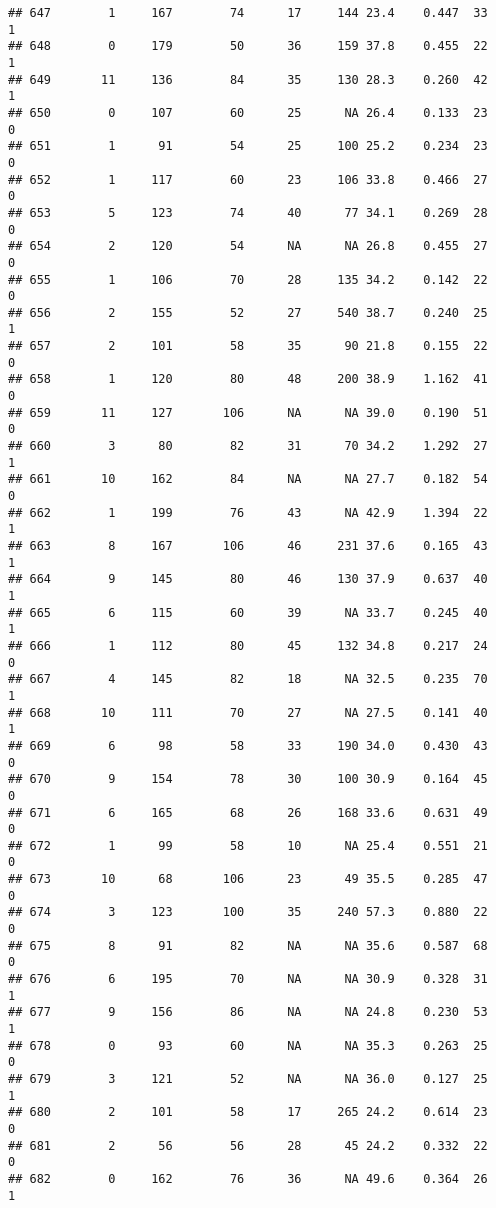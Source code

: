 \documentclass[
]{article}
\begin{document}
\begin{verbatim}
## 647        1     167        74      17     144 23.4    0.447  33    1
## 648        0     179        50      36     159 37.8    0.455  22    1
## 649       11     136        84      35     130 28.3    0.260  42    1
## 650        0     107        60      25      NA 26.4    0.133  23    0
## 651        1      91        54      25     100 25.2    0.234  23    0
## 652        1     117        60      23     106 33.8    0.466  27    0
## 653        5     123        74      40      77 34.1    0.269  28    0
## 654        2     120        54      NA      NA 26.8    0.455  27    0
## 655        1     106        70      28     135 34.2    0.142  22    0
## 656        2     155        52      27     540 38.7    0.240  25    1
## 657        2     101        58      35      90 21.8    0.155  22    0
## 658        1     120        80      48     200 38.9    1.162  41    0
## 659       11     127       106      NA      NA 39.0    0.190  51    0
## 660        3      80        82      31      70 34.2    1.292  27    1
## 661       10     162        84      NA      NA 27.7    0.182  54    0
## 662        1     199        76      43      NA 42.9    1.394  22    1
## 663        8     167       106      46     231 37.6    0.165  43    1
## 664        9     145        80      46     130 37.9    0.637  40    1
## 665        6     115        60      39      NA 33.7    0.245  40    1
## 666        1     112        80      45     132 34.8    0.217  24    0
## 667        4     145        82      18      NA 32.5    0.235  70    1
## 668       10     111        70      27      NA 27.5    0.141  40    1
## 669        6      98        58      33     190 34.0    0.430  43    0
## 670        9     154        78      30     100 30.9    0.164  45    0
## 671        6     165        68      26     168 33.6    0.631  49    0
## 672        1      99        58      10      NA 25.4    0.551  21    0
## 673       10      68       106      23      49 35.5    0.285  47    0
## 674        3     123       100      35     240 57.3    0.880  22    0
## 675        8      91        82      NA      NA 35.6    0.587  68    0
## 676        6     195        70      NA      NA 30.9    0.328  31    1
## 677        9     156        86      NA      NA 24.8    0.230  53    1
## 678        0      93        60      NA      NA 35.3    0.263  25    0
## 679        3     121        52      NA      NA 36.0    0.127  25    1
## 680        2     101        58      17     265 24.2    0.614  23    0
## 681        2      56        56      28      45 24.2    0.332  22    0
## 682        0     162        76      36      NA 49.6    0.364  26    1

\end{verbatim}
\end{document}
